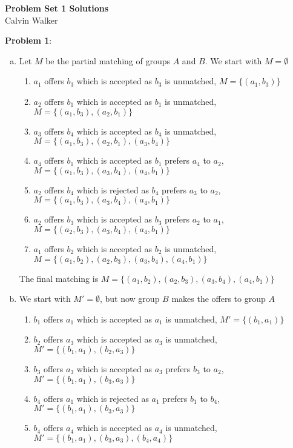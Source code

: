 \documentclass{article}
\begin{document}
\begin{center}
    \Large{\textbf{Problem Set 1 Solutions}} \\[0.25ex]
    Calvin Walker
\end{center}
\textbf{Problem 1}:
\begin{enumerate}[a)]
    \item Let $M$ be the partial matching of groups $A$ and $B$. We start with $M = \emptyset$ 
    \begin{enumerate}[1.]
        \item $a_1$ offers $b_3$ which is accepted as $b_3$ is unmatched, $M = \{(a_1, b_3)\}$
        \item $a_2$ offers $b_1$ which is accepted as $b_1$ is unmatched, $M = \{(a_1, b_3), (a_2, b_1)\}$
        \item $a_3$ offers $b_4$ which is accepted as $b_4$ is unmatched, $M = \{(a_1, b_3), (a_2, b_1), (a_3, b_4)\}$
        \item $a_4$ offers $b_1$ which is accepted as $b_1$ prefers $a_4$ to $a_2$, $M = \{(a_1, b_3), (a_3, b_4), (a_4, b_1)\}$
        \item $a_2$ offers $b_4$ which is rejected as $b_4$ prefers $a_3$ to $a_2$, $M = \{(a_1, b_3), (a_3, b_4), (a_4, b_1)\}$
        \item $a_2$ offers $b_3$ which is accepted as $b_3$ prefers $a_2$ to $a_1$, $M = \{(a_2, b_3), (a_3, b_4), (a_4, b_1)\}$
        \item $a_1$ offers $b_2$ which is accepted as $b_2$ is unmatched, $M = \{(a_1, b_2), (a_2, b_3), (a_3, b_4), (a_4, b_1)\}$
    \end{enumerate}
    The final matching is $M = \{(a_1, b_2), (a_2, b_3), (a_3, b_4), (a_4, b_1)\}$
    \item We start with $M' = \emptyset$, but now group $B$ makes the offers to group $A$
    \begin{enumerate}[1.]
        \item $b_1$ offers $a_1$ which is accepted as $a_1$ is unmatched, $M' = \{(b_1, a_1)\}$
        \item $b_2$ offers $a_3$ which is accepted as $a_3$ is unmatched, $M' = \{(b_1, a_1), (b_2, a_3)\}$
        \item $b_3$ offers $a_3$ which is accepted as $a_3$ prefers $b_3$ to $a_2$, $M' = \{(b_1, a_1), (b_3, a_3)\}$
        \item $b_4$ offers $a_1$ which is rejected as $a_1$ prefers $b_1$ to $b_4$, $M' = \{(b_1, a_1), (b_3, a_3)\}$
        \item $b_4$ offers $a_4$ which is accepted as $a_4$ is unmatched, $M' = \{(b_1, a_1), (b_3, a_3), (b_4, a_4)\}$

\end{enumerate}
\end{enumerate}
\end{document}
